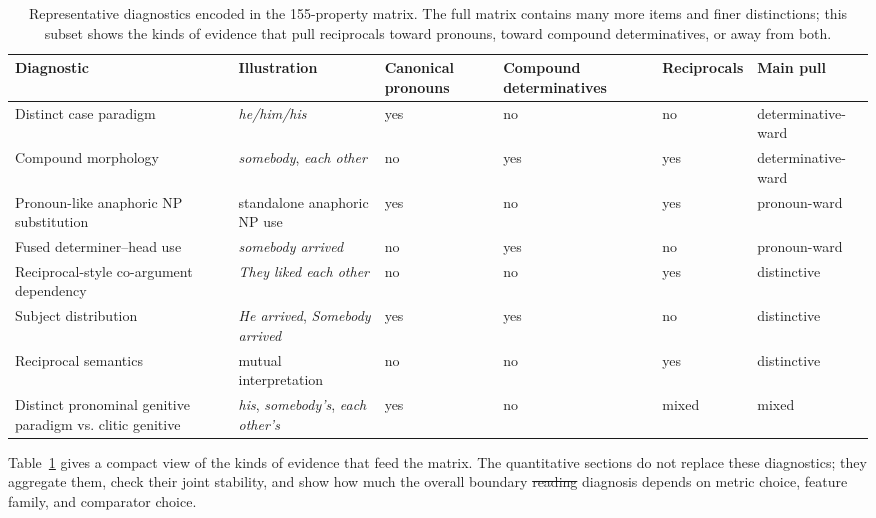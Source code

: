 \documentclass[12pt]{article}
\providecommand{\mention}[1]{\textit{#1}}
\providecommand{\DIFaddtex}[1]{{\protect\color{DIFgreen}#1}} %
\providecommand{\DIFdeltex}[1]{{\protect\color{red}\sout{#1}}}                      %
\providecommand{\DIFaddbegin}{} %
\providecommand{\DIFaddend}{} %
\providecommand{\DIFdelbegin}{} %
\providecommand{\DIFdelend}{} %
\providecommand{\DIFadd}[1]{\texorpdfstring{\DIFaddtex{#1}}{#1}} %
\providecommand{\DIFdel}[1]{\texorpdfstring{\DIFdeltex{#1}}{}} %
\newcommand{\DIFscaledelfig}{0.5}
\newlength{\DIFdelgraphicswidth} %
\newlength{\DIFdelgraphicsheight} %
\newcommand{\DIFaddincludegraphics}[2][]{{\color{DIFgreen}\fbox{\DIFOincludegraphics[#1]{#2}}}} %
\newcommand{\DIFdelincludegraphics}[2][]{%
\sbox{\DIFdelgraphicsbox}{\DIFOincludegraphics[#1]{#2}}%
\settoboxwidth{\DIFdelgraphicswidth}{\DIFdelgraphicsbox} %
\settoboxtotalheight{\DIFdelgraphicsheight}{\DIFdelgraphicsbox} %
\scalebox{\DIFscaledelfig}{%
\parbox[b]{\DIFdelgraphicswidth}{\usebox{\DIFdelgraphicsbox}\\[-\baselineskip] \rule{\DIFdelgraphicswidth}{0em}}\llap{\resizebox{\DIFdelgraphicswidth}{\DIFdelgraphicsheight}{%
\setlength{\unitlength}{\DIFdelgraphicswidth}%
\begin{picture}(1,1)%
\thicklines\linethickness{2pt} %
{\color[rgb]{1,0,0}\put(0,0){\framebox(1,1){}}}%
{\color[rgb]{1,0,0}\put(0,0){\line( 1,1){1}}}%
{\color[rgb]{1,0,0}\put(0,1){\line(1,-1){1}}}%
\end{picture}%
}\hspace*{3pt}}} %
} %
\DeclareRobustCommand{\DIFaddbegin}{\DIFOaddbegin \let\includegraphics\DIFaddincludegraphics} %
\DeclareRobustCommand{\DIFaddend}{\DIFOaddend \let\includegraphics\DIFOincludegraphics} %
\DeclareRobustCommand{\DIFdelbegin}{\DIFOdelbegin \let\includegraphics\DIFdelincludegraphics} %
\DeclareRobustCommand{\DIFdelend}{\DIFOaddend \let\includegraphics\DIFOincludegraphics} %
\begin{document}
\begin{table}[!htbp]
    \centering
    \scriptsize
    \setlength{\tabcolsep}{4pt}
    \begin{tabular}{>{\raggedright\arraybackslash}p{} >{\raggedright\arraybackslash}p{} p{} p{} p{} p{}}
        \toprule
        Diagnostic & Illustration & Canonical pronouns & Compound determinatives & Reciprocals & Main pull \\
        \midrule
        Distinct case paradigm & \mention{he/him/his} & yes & no & no & determinative-ward \\
        Compound morphology & \mention{somebody}, \mention{each other} & no & yes & yes & determinative-ward \\
        Pronoun-like anaphoric NP substitution & standalone anaphoric NP use & yes & no & yes & pronoun-ward \\
        Fused determiner--head use & \mention{somebody arrived} & no & yes & no & pronoun-ward \\
        Reciprocal-style co-argument dependency & \mention{They liked each other} & no & no & yes & distinctive \\
        Subject distribution & \mention{He arrived}, \mention{Somebody arrived} & yes & yes & no & distinctive \\
        Reciprocal semantics & mutual interpretation & no & no & yes & distinctive \\
        Distinct pronominal genitive paradigm vs. clitic genitive & \mention{his}, \mention{somebody's}, \mention{each other's} & yes & no & mixed & mixed \\
        \bottomrule
    \end{tabular}
    \caption{Representative diagnostics encoded in the 155-property matrix. The full matrix contains many more items and finer distinctions; this subset shows the kinds of evidence that pull reciprocals toward pronouns, toward compound determinatives, or away from both.}
    \label{tab:diagnostics}
\end{table}

Table~\ref{tab:diagnostics} gives a compact view of the kinds of evidence that feed the matrix. The quantitative sections do not replace these diagnostics; they aggregate them, check their joint stability, and show how much the overall boundary \DIFdelbegin \DIFdel{reading }\DIFdelend \DIFaddbegin \DIFadd{diagnosis }\DIFaddend depends on metric choice, feature family, and comparator choice.
\end{document}
